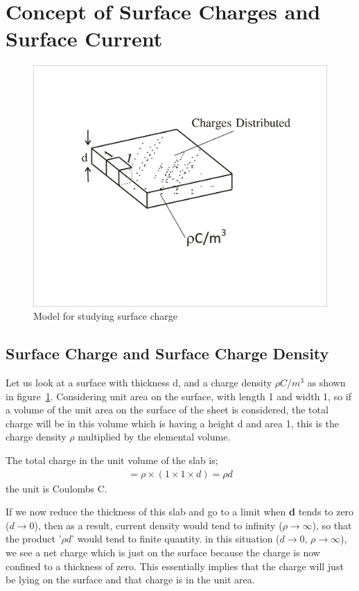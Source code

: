 \section{Concept of Surface Charges and Surface Current}
\begin{figure}[h]
\centering
\includegraphics[width=.7\linewidth]{graphics/surfacecharge}
\caption{Model for studying surface charge}
\label{fig:surfacecharge}
\end{figure} 

\subsection{Surface Charge and Surface Charge Density}
Let us look at a surface with thickness d, and a charge density $\rho$$C/m^{3}$ as shown in figure~\ref{fig:surfacecharge}. Considering unit area on the surface, with length 1 and width 1, so if a volume of the unit area on the surface of the sheet is considered, the total charge will be in this volume which is having a height d and area 1, this is the charge density $\rho$ multiplied by the elemental volume.

The total charge in the unit volume of the slab is;
\begin{align*}
=\rho\times(1\times 1\times d)=\rho d
\end{align*}
the unit is Coulombs C.

If we now reduce the thickness of this slab and go to a limit when \textbf{d} tends to zero ($d\rightarrow 0$), then as a result, current density would tend to infinity ($\rho\rightarrow\infty$), so that the product '$\rho d$' would tend to finite quantity. in this situation ($d\rightarrow 0$, $\rho\rightarrow\infty$), we see a net charge which is just on the surface because the charge is now confined to a thickness of zero. This essentially implies that the charge will just be lying on the surface and that charge is in the unit area. 


